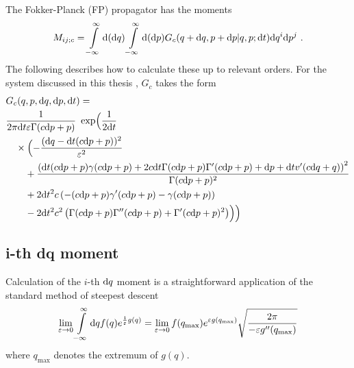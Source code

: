The Fokker-Planck (FP) propagator has the moments
\begin{align}
	\label{eqn:fp-moment-integral}
	M_{ij;c} =
		\int\limits_{-\infty}^\infty\mathrm{d} (\mathrm{d} q)
		\int\limits_{-\infty}^\infty\mathrm{d} (\mathrm{d} p)
		G_c(q+\mathrm{d} q,p+\mathrm{d} p|q,p; \mathrm{d} t)\mathrm{d} q^i\mathrm{d} p^j ~.
\end{align}
%
The following describes how to calculate these up to relevant orders. For the system discussed in this thesis  \cite{flow-paper}, \(G_c\) takes the form
%
\begin{align}
	\label{eqn:fp-propagator}
	&G_c(q,p,\mathrm{d} q,\mathrm{d} p,\mathrm{d} t) = \\ \notag
	& \frac1{2 \pi  \mathrm{d} t \varepsilon  \Gamma (c \mathrm{d} p +p)}
	  ~\operatorname{exp} \Bigl(\frac1{2 \mathrm{d} t} \\ \notag
	&\quad \times \Bigl(
		-\frac{(\mathrm{d} q-\mathrm{d} t (c \mathrm{d} p +p))^2}{\varepsilon ^2} \\ \notag
		&\qquad +\frac{\left(\mathrm{d} t (c \mathrm{d} p +p) \gamma (c \mathrm{d} p +p)+2 c \mathrm{d} t  \Gamma (c \mathrm{d} p +p) \Gamma '(c \mathrm{d} p +p)+\mathrm{d} p+\mathrm{d} t v'(c \mathrm{d} q+q)\right)^2}{\Gamma (c \mathrm{d} p +p)^2} \\ \notag
		&\qquad +2 \mathrm{d} t^2 c  \left(-(c \mathrm{d} p +p) \gamma '(c \mathrm{d} p +p)-\gamma (c \mathrm{d} p +p)\right) \\ \notag
		&\qquad -2 \mathrm{d} t^2 c ^2 \left(\Gamma (c \mathrm{d} p +p) \Gamma ''(c \mathrm{d} p +p)+\Gamma '(c \mathrm{d} p +p)^2\right)\Bigr)\Bigr)
\end{align}


\subsection{i-th dq moment}

Calculation of the \(i\)-th \(\mathrm{d} q\) moment is a straightforward application of the standard method of steepest descent
\begin{align}
	\label{eqn:steepest-descent}
	\lim_{\varepsilon\to0}\int\limits_{-\infty}^\infty\mathrm{d} q f(q)e^{\frac1\varepsilon g(q)}
	= \lim_{\varepsilon\to0} f(q_{\text{max}}) e^{\varepsilon g(q_{\text{max}})}\sqrt{\frac{2\pi}{-\varepsilon g''(q_{\text{max}})}}
\end{align}
where \(q_{\text{max}}\) denotes the extremum of \(g(q)\).


